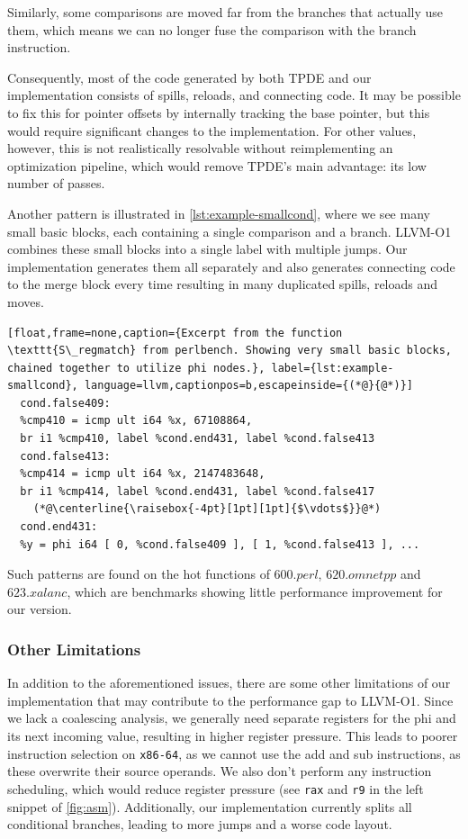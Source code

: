 Similarly, some comparisons are moved far from the branches that actually use them, which means we can no longer fuse the comparison with the branch instruction.

Consequently, most of the code generated by both TPDE and our implementation consists of spills, reloads, and connecting code. It may be possible to fix this for pointer offsets by internally tracking the base pointer, but this would require significant changes to the implementation. For other values, however, this is not realistically resolvable without reimplementing an optimization pipeline, which would remove TPDE's main advantage: its low number of passes.



Another pattern is illustrated in \autoref{lst:example-smallcond}, where we see many small basic blocks, each containing a single comparison and a branch.
LLVM-O1 combines these small blocks into a single label with multiple jumps. Our implementation generates them all separately and also generates connecting code to the merge block every time resulting in many duplicated spills, reloads and moves. 

\begin{lstlisting}[float,frame=none,caption={Excerpt from the function \texttt{S\_regmatch} from perlbench. Showing very small basic blocks, chained together to utilize phi nodes.}, label={lst:example-smallcond}, language=llvm,captionpos=b,escapeinside={(*@}{@*)}]
  cond.false409:
  %cmp410 = icmp ult i64 %x, 67108864,
  br i1 %cmp410, label %cond.end431, label %cond.false413
  cond.false413:
  %cmp414 = icmp ult i64 %x, 2147483648,
  br i1 %cmp414, label %cond.end431, label %cond.false417
    (*@\centerline{\raisebox{-4pt}[1pt][1pt]{$\vdots$}}@*)
  cond.end431:
  %y = phi i64 [ 0, %cond.false409 ], [ 1, %cond.false413 ], ...

\end{lstlisting}

Such patterns are found on the hot functions of $600.perl$, $620.omnetpp$ and $623.xalanc$, which are  benchmarks showing little performance improvement for our version.

\subsubsection{Other Limitations}

In addition to the aforementioned issues, there are some other limitations of our implementation that may  contribute to the performance gap to LLVM-O1. Since we lack a coalescing analysis, we generally need separate registers for the phi and its next incoming value, resulting in higher register pressure. This leads to poorer instruction selection on \texttt{x86-64}, as we cannot use the add and sub instructions, as these overwrite their source operands. We also don't perform any instruction scheduling, which would reduce register pressure (see \texttt{rax} and \texttt{r9} in the left snippet of \autoref{fig:asm}). Additionally, our implementation currently splits all conditional branches, leading to more jumps and a worse code layout. 

